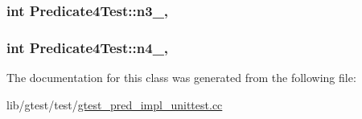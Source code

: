 \hypertarget{class_predicate4_test_a00ae6ae54c7d6639d448c036aedb6114}{
\subsubsection[{n3\-\_\-}]{\setlength{\rightskip}{0pt plus 5cm}int Predicate4\-Test\-::n3\-\_\-\hspace{0.3cm}{\ttfamily [static]}, {\ttfamily [protected]}}}\label{class_predicate4_test_a00ae6ae54c7d6639d448c036aedb6114}
\hypertarget{class_predicate4_test_ae42e23ce11e3f1c6b813496d6180cc67}{
\subsubsection[{n4\-\_\-}]{\setlength{\rightskip}{0pt plus 5cm}int Predicate4\-Test\-::n4\-\_\-\hspace{0.3cm}{\ttfamily [static]}, {\ttfamily [protected]}}}\label{class_predicate4_test_ae42e23ce11e3f1c6b813496d6180cc67}


The documentation for this class was generated from the following file\-:\begin{DoxyCompactItemize}
\item 
lib/gtest/test/\hyperlink{gtest__pred__impl__unittest_8cc}{gtest\-\_\-pred\-\_\-impl\-\_\-unittest.\-cc}\end{DoxyCompactItemize}
